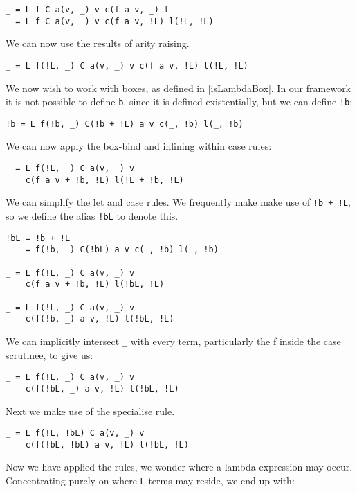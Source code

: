 \documentclass[preprint]{sigplanconf}
\begin{document}
\begin{verbatim}
_ = L f C a(v, _) v c(f a v, _) l
_ = L f C a(v, _) v c(f a v, !L) l(!L, !L)
\end{verbatim}

We can now use the results of arity raising.

\begin{verbatim}
_ = L f(!L, _) C a(v, _) v c(f a v, !L) l(!L, !L)
\end{verbatim}

We now wish to work with boxes, as defined in |isLambdaBox|. In our framework it is not possible to define \verb"b", since it is defined existentially, but we can define \verb"!b":

\begin{verbatim}
!b = L f(!b, _) C(!b + !L) a v c(_, !b) l(_, !b)
\end{verbatim}

We can now apply the box-bind and inlining within case rules:

\begin{verbatim}
_ = L f(!L, _) C a(v, _) v
    c(f a v + !b, !L) l(!L + !b, !L)
\end{verbatim}

We can simplify the let and case rules. We frequently make make use of \verb"!b + !L", so we define the alias \verb"!bL" to denote this.

\begin{verbatim}
!bL = !b + !L
    = f(!b, _) C(!bL) a v c(_, !b) l(_, !b)

_ = L f(!L, _) C a(v, _) v
    c(f a v + !b, !L) l(!bL, !L)

_ = L f(!L, _) C a(v, _) v
    c(f(!b, _) a v, !L) l(!bL, !L)
\end{verbatim}

We can implicitly intersect \verb"_" with every term, particularly the f inside the case scrutinee, to give us:

\begin{verbatim}
_ = L f(!L, _) C a(v, _) v
    c(f(!bL, _) a v, !L) l(!bL, !L)
\end{verbatim}

Next we make use of the specialise rule.

\begin{verbatim}
_ = L f(!L, !bL) C a(v, _) v
    c(f(!bL, !bL) a v, !L) l(!bL, !L)
\end{verbatim}

Now we have applied the rules, we wonder where a lambda expression may occur. Concentrating purely on where \verb"L" terms may reside, we end up with:
\end{document}
